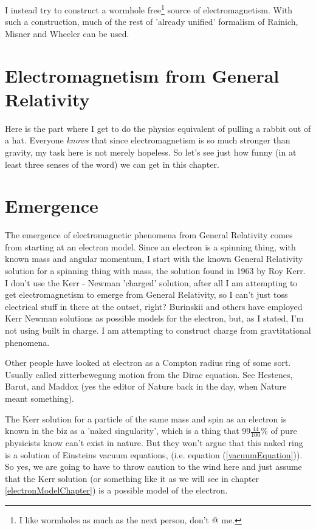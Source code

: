 \documentclass[../rzero]{subfiles}
\begin{document}
I instead try to construct a wormhole free\footnote{I like wormholes as much as the next person, don't @ me.} source of  electromagnetism. With such a construction, much of the rest of 'already unified' formalism of Rainich, Misner and Wheeler can be used.

\section{Electromagnetism from General Relativity}
Here is the part where I get to do the physics equivalent of pulling a rabbit out of a hat. Everyone \textit{knows} that since electromagnetism is so much stronger than gravity, my task here is not merely hopeless. So let's see just how funny (in at least three senses of the word) we can get in this chapter. 


\section{Emergence}
The emergence of electromagnetic phenomena from General Relativity comes from starting at an electron model. Since an electron is a spinning thing, with known mass and angular momentum, I start with the known General Relativity solution for a spinning thing with mass, the  solution found in 1963 by Roy Kerr\cite{kerrGravitationalFieldSpinning1963}. I don't use the Kerr - Newman 'charged' solution\cite{newmanNoteKerrSpinningParticle1965}, after all I am attempting to get electromagnetism to emerge from General Relativity, so I can't just toss electrical stuff in there at the outset, right? Burinskii\cite{Burinskii2008} and others have employed Kerr Newman solutions as possible models for the electron, but, as I stated, I'm not using built in charge. I am attempting to construct charge from gravtitational phenomena.

Other people have looked at electron as a Compton radius ring of some sort. Usually called zitterbewegung motion from the Dirac equation\cite{diracQuantumTheoryElectron1997}. See Hestenes\cite{Hestenes1990}, Barut\cite{Barut1984}, and Maddox\cite{Maddox1987} (yes the editor of Nature back in the day, when Nature meant something).

The Kerr solution for a particle of the same mass and spin as an electron is known in the biz as a 'naked singularity', which is a thing that 99$\frac{44}{100}$\% of pure physicists know can't exist in nature. But they won't argue that this naked ring is a solution of Einsteins vacuum equations, (i.e. equation (\ref{vacuumEquation})). So yes, we are going to have to throw caution to the wind here and just assume that the Kerr solution (or something like it as we will see in chapter \ref{electronModelChapter}) is a possible model of the electron. 
\end{document}
